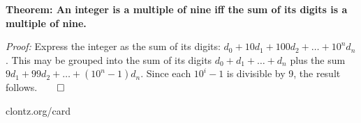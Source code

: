 \documentclass[12pt]{article}
\begin{document}
\thispagestyle{empty}


      \textbf{%
        Theorem: An integer is a multiple of nine iff the sum of
        its digits is a multiple of nine.
      }

      \textit{Proof:}
      Express the integer as the sum of its digits:
      \(d_0+10d_1+100d_2+\dots+10^nd_n\).
      This may be grouped into the sum of its digits
      \(d_0+d_1+\dots+d_n\) plus the sum
      \(9d_1+99d_2+\dots+(10^n-1)d_n\). Since each
      \(10^i-1\) is divisible by 9, the result
      follows.\(\qed\)

\begin{center}
\scalebox{1.3}{\color{gray}}
\end{center}

\begin{center}
  \color{darkgray} clontz.org/card
\end{center}
\end{document}
